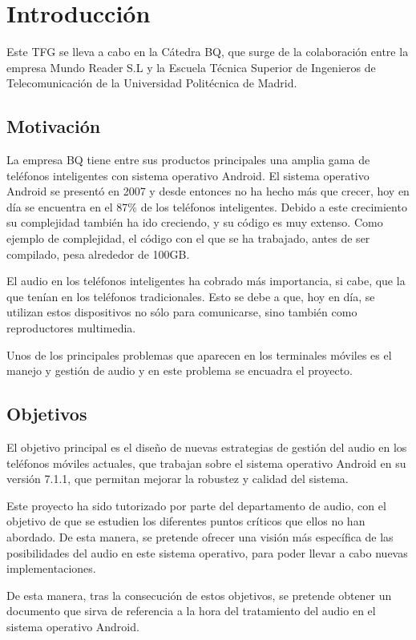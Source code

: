 \chapter{Introducción}
Este \gls{TFG} se lleva a cabo en la Cátedra BQ, que surge de la colaboración entre la empresa Mundo Reader S.L y la Escuela Técnica Superior de Ingenieros de Telecomunicación de la Universidad Politécnica de Madrid.

\section{Motivación}
La empresa BQ tiene entre sus productos principales una amplia gama de teléfonos inteligentes con sistema operativo Android. El sistema operativo Android se presentó en 2007 y desde entonces no ha hecho más que crecer, hoy en día se encuentra en el 87\% de los teléfonos inteligentes. Debido a este crecimiento su complejidad también ha ido creciendo, y su código es muy extenso. Como ejemplo de complejidad, el código con el que se ha trabajado, antes de ser compilado, pesa alrededor de 100\gls{GB}.

El audio en los teléfonos inteligentes ha cobrado más importancia, si cabe, que la que tenían en los teléfonos tradicionales. Esto se debe a que, hoy en día, se utilizan estos dispositivos no sólo para comunicarse, sino también como reproductores multimedia.

Unos de los principales problemas que aparecen en los terminales móviles es el manejo y gestión de audio y en este problema se encuadra el proyecto.

\section{Objetivos}
El objetivo principal es el diseño de nuevas estrategias de gestión del audio en los teléfonos móviles actuales, que trabajan sobre el sistema operativo Android en su versión 7.1.1, que permitan mejorar la robustez y calidad del sistema.

Este proyecto ha sido tutorizado por parte del departamento de audio, con el objetivo de que se estudien los diferentes puntos críticos que ellos no han abordado. De esta manera, se pretende ofrecer una visión más específica de las posibilidades del audio en este sistema operativo, para poder llevar a cabo nuevas implementaciones.

De esta manera, tras la consecución de estos objetivos, se pretende obtener un documento que sirva de referencia a la hora del tratamiento del audio en el sistema operativo Android.

